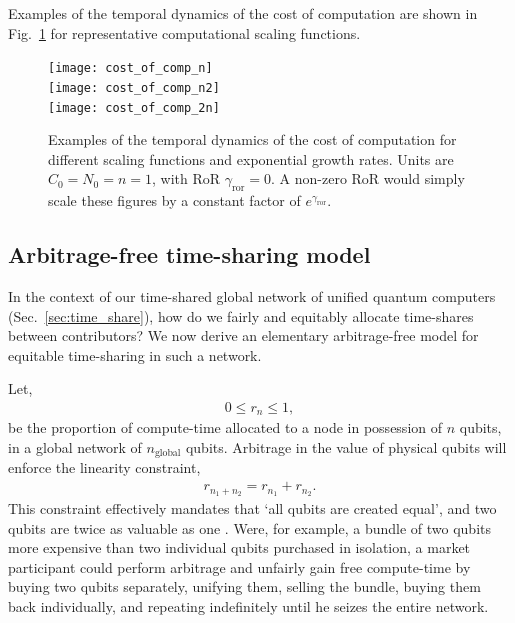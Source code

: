 Examples of the temporal dynamics of the cost of computation are shown in Fig.~\ref{fig:econ_cost_of_comp} for representative computational scaling functions.

\begin{figure}[!htb]
\texttt{[image: cost\_of\_comp\_n]} \\
\texttt{[image: cost\_of\_comp\_n2]} \\
\texttt{[image: cost\_of\_comp\_2n]}
\caption{Examples of the temporal dynamics of the cost of computation for different scaling functions and exponential growth rates. Units are \mbox{$C_0=N_0=n=1$}, with RoR \mbox{$\gamma_\text{ror}=0$}. A non-zero RoR would simply scale these figures by a constant factor of $e^{\gamma_\text{ror}}$.}\label{fig:econ_cost_of_comp}
\end{figure}

%
%

\subsection{Arbitrage-free time-sharing model}\label{sec:arb_free_time_share} 

In the context of our time-shared global network of unified quantum computers (Sec.~\ref{sec:time_share}), how do we fairly and equitably allocate time-shares between contributors? We now derive an elementary arbitrage-free model for equitable time-sharing in such a network.

Let,
\begin{align}
	0\leq r_n \leq 1,
\end{align}
be the proportion of compute-time allocated to a node in possession of $n$ qubits, in a global network of $n_\text{global}$ qubits. Arbitrage in the value of physical qubits will enforce the linearity constraint,
\begin{align}
	r_{n_1+n_2} = r_{n_1} + r_{n_2}.
\end{align}
This constraint effectively mandates that `all qubits are created equal', and two qubits are twice as valuable as one . Were, for example, a bundle of two qubits more expensive than two individual qubits purchased in isolation, a market participant could perform arbitrage and unfairly gain free compute-time by buying two qubits separately, unifying them, selling the bundle, buying them back individually, and repeating indefinitely until he seizes the entire network.


